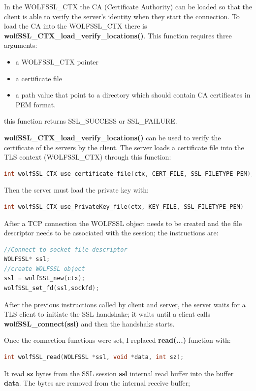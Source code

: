 \documentclass[a4paper,12pt]{article}
\begin{document}
In the WOLFSSL\_CTX the CA (Certificate Authority) can be loaded so that the client is able to verify the server's identity when they start the connection. To load the CA into the WOLFSSL\_CTX there is \\\textbf{wolfSSL\_CTX\_load\_verify\_locations()}. This function requires three arguments:
\begin{itemize}
\item a WOLFSSL\_CTX pointer
\item a certificate file
\item a path value that point to a directory which should contain CA certificates in PEM format.
\end{itemize}
this function returns SSL\_SUCCESS or SSL\_FAILURE.

\textbf{wolfSSL\_CTX\_load\_verify\_locations()} can be used to verify the certificate of the servers by the client.
The server loads a certificate file into the TLS context (WOLFSSL\_CTX) through this function:
\begin{lstlisting}[language=c]
int wolfSSL_CTX_use_certificate_file(ctx, CERT_FILE, SSL_FILETYPE_PEM);
\end{lstlisting}
Then the server must load the private key with:
\begin{lstlisting}[language=c]
int wolfSSL_CTX_use_PrivateKey_file(ctx, KEY_FILE, SSL_FILETYPE_PEM)
\end{lstlisting}

After a TCP connection the WOLFSSL object needs to be created and the file descriptor needs to be associated with the session; the instructions are:
\begin{lstlisting}[language=c]
//Connect to socket file descriptor
WOLFSSL* ssl;
//create WOLFSSL object
ssl = wolfSSL_new(ctx);
wolfSSL_set_fd(ssl,sockfd);
\end{lstlisting}
After the previous instructions called by client and server, the server waits for a TLS client to initiate the SSL handshake; it waits until a client calls \textbf{wolfSSL\_connect(ssl)} and then the handshake starts.

Once the connection functions were set, I replaced \textbf{read(...)} function with: 
\begin{lstlisting}[language=c]
int wolfSSL_read(WOLFSSL *ssl, void *data, int sz);
\end{lstlisting}
It read \textbf{sz} bytes from the SSL session \textbf{ssl} internal read buffer into the buffer \textbf{data}. The bytes are removed from the internal receive buffer;
\end{document}
